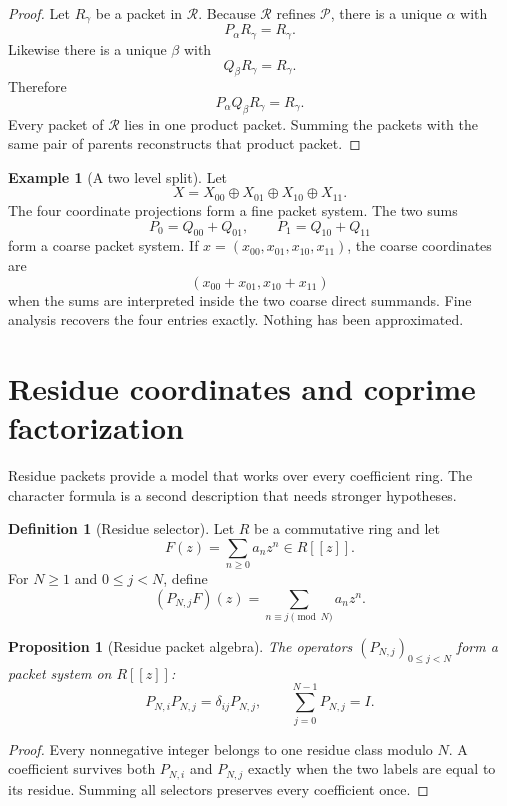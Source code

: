 \documentclass{aomart}
\newtheorem{proposition}[proposition]{Proposition}
\theoremstyle{definition}
\newtheorem{definition}[definition]{Definition}
\newtheorem{example}[example]{Example}
\theoremstyle{remark}
\newcommand{\Pcal}{\mathcal P}
\newcommand{\Rcal}{\mathcal R}
\begin{document}
\begin{proof}
Let $R_\gamma$ be a packet in $\Rcal$.  Because $\Rcal$ refines $\Pcal$, there is a unique $\alpha$ with
\[
P_\alpha R_\gamma=R_\gamma.
\]
Likewise there is a unique $\beta$ with
\[
Q_\beta R_\gamma=R_\gamma.
\]
Therefore
\[
P_\alpha Q_\beta R_\gamma=R_\gamma.
\]
Every packet of $\Rcal$ lies in one product packet.  Summing the packets with the same pair of parents reconstructs that product packet.
\end{proof}

\begin{example}[A two level split]\label{ex:two_level_split}
Let
\[
X=X_{00}\oplus X_{01}\oplus X_{10}\oplus X_{11}.
\]
The four coordinate projections form a fine packet system.  The two sums
\[
P_0=Q_{00}+Q_{01},
\qquad
P_1=Q_{10}+Q_{11}
\]
form a coarse packet system.  If $x=(x_{00},x_{01},x_{10},x_{11})$, the coarse coordinates are
\[
(x_{00}+x_{01},x_{10}+x_{11})
\]
when the sums are interpreted inside the two coarse direct summands.  Fine analysis recovers the four entries exactly.  Nothing has been approximated.
\end{example}

\section{Residue coordinates and coprime factorization}\label{sec:residue}

Residue packets provide a model that works over every coefficient ring.  The character formula is a second description that needs stronger hypotheses.

\begin{definition}[Residue selector]\label{def:residue_selector}
Let $R$ be a commutative ring and let
\[
F(z)=\sum_{n\geq0}a_nz^n\in R[[z]].
\]
For $N\geq1$ and $0\leq j<N$, define
\[
(P_{N,j}F)(z)
=
\sum_{n\equiv j\pmod N}a_nz^n.
\]
\end{definition}

\begin{proposition}[Residue packet algebra]\label{prop:residue_algebra}
The operators $(P_{N,j})_{0\leq j<N}$ form a packet system on $R[[z]]$:
\[
P_{N,i}P_{N,j}=\delta_{ij}P_{N,j},
\qquad
\sum_{j=0}^{N-1}P_{N,j}=I.
\]
\end{proposition}

\begin{proof}
Every nonnegative integer belongs to one residue class modulo $N$.  A coefficient survives both $P_{N,i}$ and $P_{N,j}$ exactly when the two labels are equal to its residue.  Summing all selectors preserves every coefficient once.
\end{proof}
\end{document}

